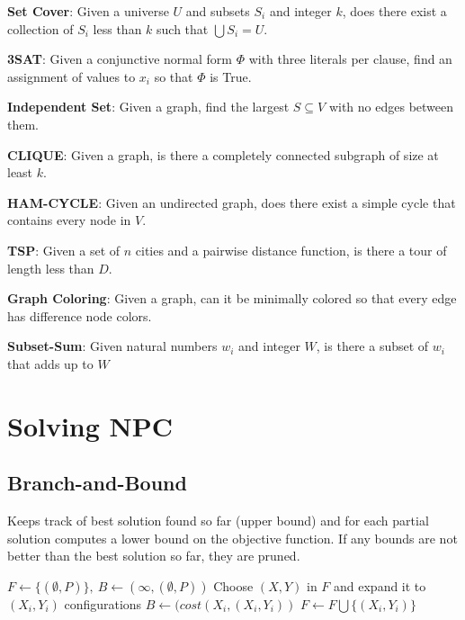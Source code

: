 \textbf{Set Cover}: Given a universe $U$ and subsets $S_i$ and integer $k$, does there exist a collection of $S_i$ less than $k$ such that $\bigcup S_i = U$.

\textbf{3SAT}: Given a conjunctive normal form $\Phi$ with three literals per clause, find an assignment of values to $x_i$ so that $\Phi$ is True.  

\textbf{Independent Set}: Given a graph, find the largest $S \subseteq V$ with no edges between them. 

\textbf{CLIQUE}: Given a graph, is there a completely connected subgraph of size at least $k$. 

\textbf{HAM-CYCLE}: Given an undirected graph, does there exist a simple cycle that contains every node in $V$.

\textbf{TSP}: Given a set of $n$ cities and a pairwise distance function, is there a tour of length less than $D$. 

\textbf{Graph Coloring}: Given a graph, can it be minimally colored so that every edge has difference node colors. 

\textbf{Subset-Sum}: Given natural numbers $w_i$ and integer $W$, is there a subset of $w_i$ that adds up to $W$

\section*{Solving NPC}

\subsection*{Branch-and-Bound}
Keeps track of best solution found so far (upper bound) and for each partial solution computes a lower bound on the objective function.
If any bounds are not better than the best solution so far, they are pruned. 

\begin{algorithm}[H]
\begin{algorithmic}[1]
\State $F \gets \{(\emptyset, P)\},\ B \gets (\infty, (\emptyset, P))$
\State Choose $(X,Y)$ in $F$ and expand it to $(X_i,Y_i)$ configurations
 $B \gets (cost(X_i,(X_i,Y_i))$
\EndIf
\EndIf
{}
 $F \gets F \bigcup \{(X_i,Y_i)\}$
\EndIf
\EndIf
\EndFor
\EndWhile
\State {} 
\EndProcedure
\end{algorithmic}
\end{algorithm}

